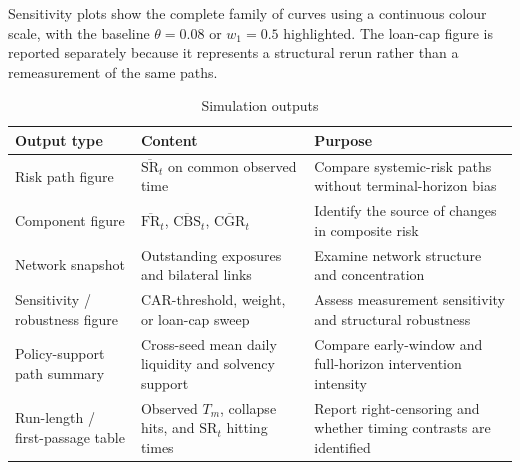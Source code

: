 Sensitivity plots show the complete family of curves using a continuous
colour scale, with the baseline \(\theta=0.08\) or \(w_1=0.5\) highlighted.
The loan-cap figure is reported separately because it represents a
structural rerun rather than a remeasurement of the same paths.

\begin{table}[htbp]
\centering
\caption{Simulation outputs}
\label{tab:simulation-outputs}
\small
\renewcommand{\arraystretch}{1.16}
\begin{tabularx}{\textwidth}{
@{}
>{\raggedright\arraybackslash}p{}
>{\raggedright\arraybackslash}p{}
X
@{}
}
\toprule
\textbf{Output type} & \textbf{Content} & \textbf{Purpose}\\
\midrule
Risk path figure
& $\overline{\mathrm{SR}}_{t}$ on common observed time
& Compare systemic-risk paths without terminal-horizon bias\\

Component figure
& $\overline{\mathrm{FR}}_{t}$,
  $\overline{\mathrm{CBS}}_{t}$,
  $\overline{\mathrm{CGR}}_{t}$
& Identify the source of changes in composite risk\\

Network snapshot
& Outstanding exposures and bilateral links
& Examine network structure and concentration\\

Sensitivity / robustness figure
& CAR-threshold, weight, or loan-cap sweep
& Assess measurement sensitivity and structural robustness\\

Policy-support path summary
& Cross-seed mean daily liquidity and solvency support
& Compare early-window and full-horizon intervention intensity\\

Run-length / first-passage table
& Observed $T_m$, collapse hits, and $\mathrm{SR}_t$ hitting times
& Report right-censoring and whether timing contrasts are identified\\
\bottomrule
\end{tabularx}
\end{table}
